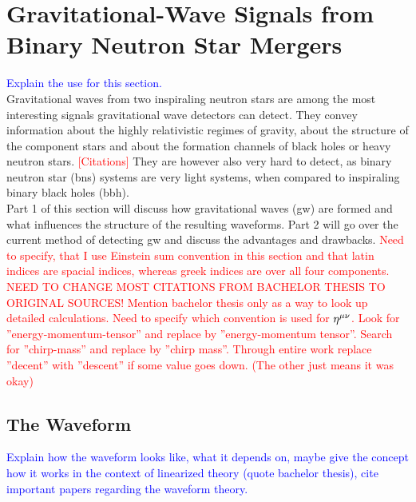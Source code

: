 \section{Gravitational-Wave Signals from Binary Neutron Star Mergers}
\textcolor{blue}{Explain the use for this section.}\\
Gravitational waves from two inspiraling neutron stars are among the most interesting signals gravitational wave detectors can detect. They convey information about the highly relativistic regimes of gravity, about the structure of the component stars and about the formation channels of black holes or heavy neutron stars. \textcolor{red}{[Citations]} They are however also very hard to detect, as binary neutron star (\gls{bns}) systems are very light systems, when compared to inspiraling binary black holes (\gls{bbh}).\\
Part 1 of this section will discuss how gravitational waves (\gls{gw}) are formed and what influences the structure of the resulting waveforms. Part 2 will go over the current method of detecting \gls{gw} and discuss the advantages and drawbacks. \textcolor{red}{Need to specify, that I use Einstein sum convention in this section and that latin indices are spacial indices, whereas greek indices are over all four components. NEED TO CHANGE MOST CITATIONS FROM BACHELOR THESIS TO ORIGINAL SOURCES! Mention bachelor thesis only as a way to look up detailed calculations. Need to specify which convention is used for $\eta^{\mu\nu}$. Look for ''energy-momentum-tensor'' and replace by ''energy-momentum tensor''. Search for ''chirp-mass'' and replace by ''chirp mass''. Through entire work replace ''decent'' with ''descent'' if some value goes down. (The other just means it was okay)}
\subsection{The Waveform}
\textcolor{blue}{Explain how the waveform looks like, what it depends on, maybe give the concept how it works in the context of linearized theory (quote bachelor thesis), cite important papers regarding the waveform theory.}\\
